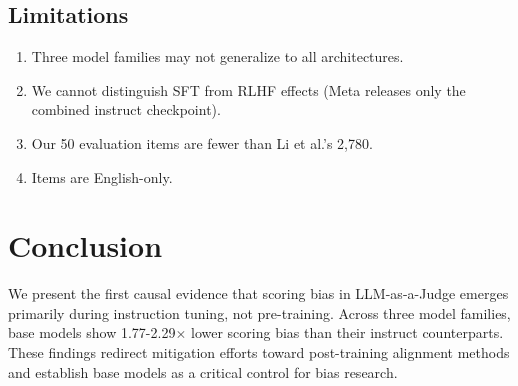 \documentclass[11pt,twocolumn]{article}
\begin{document}
\subsection{Limitations}
\begin{enumerate}
    \item Three model families may not generalize to all architectures.
    \item We cannot distinguish SFT from RLHF effects (Meta releases only the combined instruct checkpoint).
    \item Our 50 evaluation items are fewer than Li et al.'s 2,780.
    \item Items are English-only.
\end{enumerate}

\section{Conclusion}
We present the first causal evidence that scoring bias in LLM-as-a-Judge emerges primarily during instruction tuning, not pre-training. Across three model families, base models show 1.77-2.29$\times$ lower scoring bias than their instruct counterparts. These findings redirect mitigation efforts toward post-training alignment methods and establish base models as a critical control for bias research.



\end{document}
